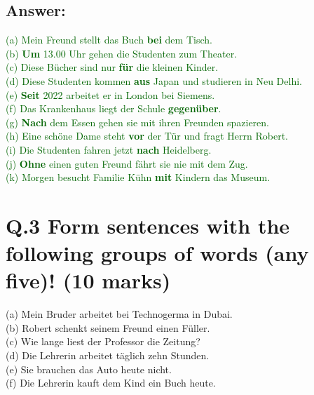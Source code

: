 \documentclass[a4paper,12pt]{article}
\begin{document}
\subsection*{Answer:}
\textcolor{darkgreen}{(a) Mein Freund stellt das Buch \textbf{bei} dem Tisch.\\}
\textcolor{darkgreen}{(b) \textbf{Um} 13.00 Uhr gehen die Studenten zum Theater.\\}
\textcolor{darkgreen}{(c) Diese Bücher sind nur \textbf{für} die kleinen Kinder.\\}
\textcolor{darkgreen}{(d) Diese Studenten kommen \textbf{aus} Japan und studieren in Neu Delhi.\\}
\textcolor{darkgreen}{(e) \textbf{Seit} 2022 arbeitet er in London bei Siemens.\\}
\textcolor{darkgreen}{(f) Das Krankenhaus liegt der Schule \textbf{gegenüber}.\\}
\textcolor{darkgreen}{(g) \textbf{Nach} dem Essen gehen sie mit ihren Freunden spazieren.\\}
\textcolor{darkgreen}{(h) Eine schöne Dame steht \textbf{vor} der Tür und fragt Herrn Robert.\\}
\textcolor{darkgreen}{(i) Die Studenten fahren jetzt \textbf{nach} Heidelberg.\\}
\textcolor{darkgreen}{(j) \textbf{Ohne} einen guten Freund fährt sie nie mit dem Zug.\\}
\textcolor{darkgreen}{(k) Morgen besucht Familie Kühn \textbf{mit} Kindern das Museum.\\}


\vspace{1cm}

\section*{Q.3 Form sentences with the following groups of words (any five)! (10 marks)}

(a) Mein Bruder arbeitet bei Technogerma in Dubai.\\
(b) Robert schenkt seinem Freund einen Füller.\\
(c) Wie lange liest der Professor die Zeitung?\\
(d) Die Lehrerin arbeitet täglich zehn Stunden.\\
(e) Sie brauchen das Auto heute nicht.\\
(f) Die Lehrerin kauft dem Kind ein Buch heute.
\end{document}
